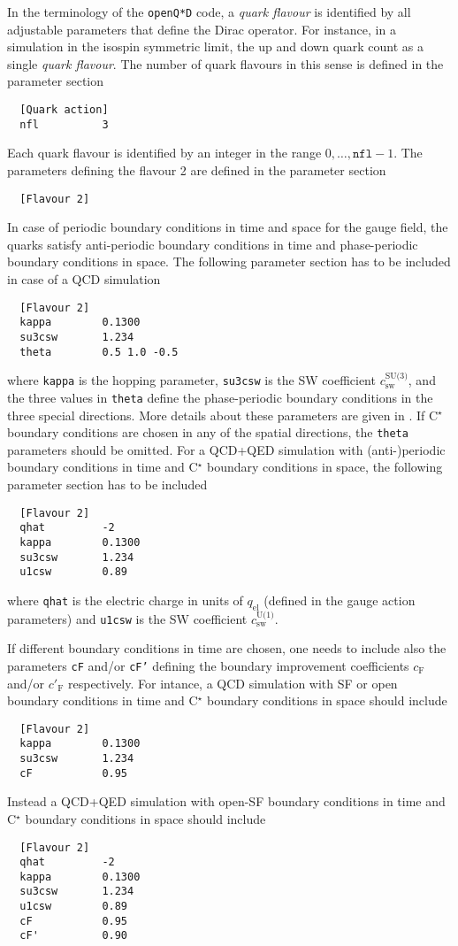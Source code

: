 \documentclass[11pt,fleqn]{article}
\begin{document}
In the terminology of the \texttt{openQ*D} code, a \textit{quark flavour} is
identified by all adjustable parameters that define the Dirac operator. For
instance, in a simulation in the isospin symmetric limit, the up and down quark
count as a single \textit{quark flavour}. The number of quark flavours in this
sense is defined in the parameter section
%
\begin{verbatim}
  [Quark action]
  nfl          3
\end{verbatim}
%
Each quark flavour is identified by an integer in the range
$0,\dots,\texttt{nfl}-1$. The parameters defining the flavour 2 are defined in
the parameter section
%
\begin{verbatim}
  [Flavour 2]
\end{verbatim}
%
In case of periodic boundary conditions in time and space for the gauge field,
the quarks satisfy anti-periodic boundary conditions in time and phase-periodic
boundary conditions in space. The following parameter section has to be included
in case of a QCD simulation
%
\begin{verbatim}
  [Flavour 2]
  kappa        0.1300
  su3csw       1.234
  theta        0.5 1.0 -0.5
\end{verbatim}
%
where \texttt{kappa} is the hopping parameter, \texttt{su3csw} is the SW
coefficient $c_\text{sw}^\text{SU(3)}$, and the three values in \texttt{theta}
define the phase-periodic boundary conditions in the three special directions.
More details about these parameters are given in \cite{dirac}. If C$^\star$
boundary conditions are chosen in any of the spatial directions, the
\texttt{theta} parameters should be omitted. For a QCD+QED simulation with
(anti-)periodic boundary conditions in time and C$^\star$ boundary conditions in
space, the following parameter section has to be included
%
\begin{verbatim}
  [Flavour 2]
  qhat         -2
  kappa        0.1300
  su3csw       1.234
  u1csw        0.89
\end{verbatim}
%
where \texttt{qhat} is the electric charge in units of $q_\text{el}$ (defined in
the gauge action parameters) and \texttt{u1csw} is the SW coefficient
$c_\text{sw}^\text{U(1)}$.

If different boundary conditions in time are chosen, one needs to include also
the parameters \texttt{cF} and/or \texttt{cF'} defining the boundary improvement
coefficients $c_\text{F}$ and/or $c'_\text{F}$ respectively. For intance, a QCD
simulation with SF or open boundary conditions in time and C$^\star$ boundary
conditions in space should include
%
\begin{verbatim}
  [Flavour 2]
  kappa        0.1300
  su3csw       1.234
  cF           0.95
\end{verbatim}
%
Instead a QCD+QED simulation with open-SF boundary conditions in time and
C$^\star$ boundary conditions in space should include
%
\begin{verbatim}
  [Flavour 2]
  qhat         -2
  kappa        0.1300
  su3csw       1.234
  u1csw        0.89
  cF           0.95
  cF'          0.90
\end{verbatim}
\end{document}
